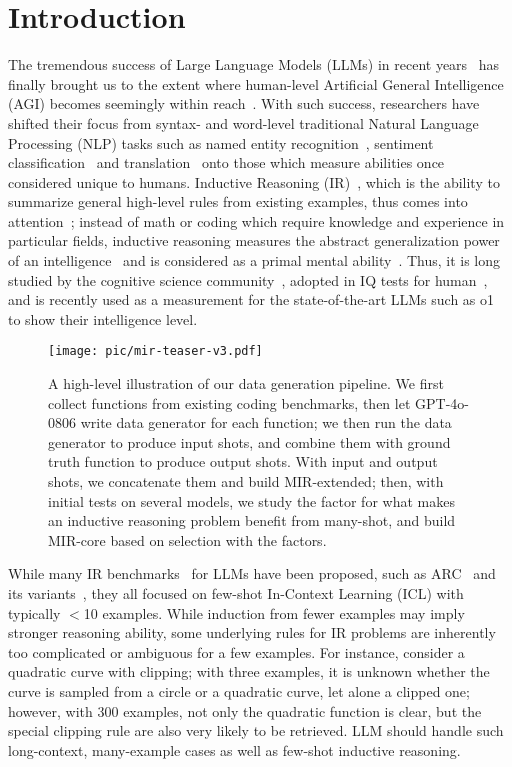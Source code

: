 \section{Introduction}
\label{sec:intro}
The tremendous success of Large Language Models (LLMs) in recent years~\citep{ouyang2022training, hurst2024gpt, jaech2024openai} has finally brought us to the extent where human-level Artificial General Intelligence (AGI) becomes seemingly within reach~\citep{jaech2024openai}. With such success, researchers have shifted their focus from syntax- and word-level traditional Natural Language Processing (NLP) tasks such as named entity recognition~\citep{mohit2014named, li2020survey}, sentiment classification~\citep{socher-etal-2013-recursive, tang2015effective} and translation~\citep{lopez2008statistical, stahlberg2020neural} onto those which measure abilities once considered unique to humans. Inductive Reasoning (IR)~\citep{hayes2010inductive}, which is the ability to summarize general high-level rules from existing examples, thus comes into attention~\citep{chollet2019measure}; instead of math or coding which require knowledge and experience in particular fields, inductive reasoning measures the abstract generalization power of an intelligence~\citep{chollet2019measure} and is considered as a primal mental ability~\citep{Kinshuk01052006}. Thus, it is long studied by the cognitive science community~\citep{bisanz1994inductive, heit2000properties}, adopted in IQ tests for human~\citep{ferrara1986children}, and is recently used as a measurement for the state-of-the-art LLMs such as o1~\citep{jaech2024openai} to show their intelligence level.
\begin{figure*}
    \centering
    \texttt{[image: pic/mir-teaser-v3.pdf]}
    \caption{A high-level illustration of our data generation pipeline. We first collect functions from existing coding benchmarks, then let GPT-4o-0806 write data generator for each function; we then run the data generator to produce input shots, and combine them with ground truth function to produce output shots. With input and output shots, we concatenate them and build MIR-extended; then, with initial tests on several models, we study the factor for what makes an inductive reasoning problem benefit from many-shot, and build MIR-core based on selection with the factors.}
    \label{fig:teaser}
\end{figure*}
While many IR benchmarks~\citep{banatt2024wilt, ma2024kor, li2024mirage} for LLMs have been proposed, such as ARC~\citep{chollet2019measure} and its variants~\citep{xu2023llms, kim2022playgrounds}, they all focused on few-shot In-Context Learning (ICL) with typically $<$10 examples. While induction from fewer examples may imply stronger reasoning ability, some underlying rules for IR problems are inherently too complicated or ambiguous for a few examples. For instance, consider a quadratic curve with clipping; with three examples, it is unknown whether the curve is sampled from a circle or a quadratic curve, let alone a clipped one; however, with $300$ examples, not only the quadratic function is clear, but the special clipping rule are also very likely to be retrieved. LLM should handle such long-context, many-example cases as well as few-shot inductive reasoning.

